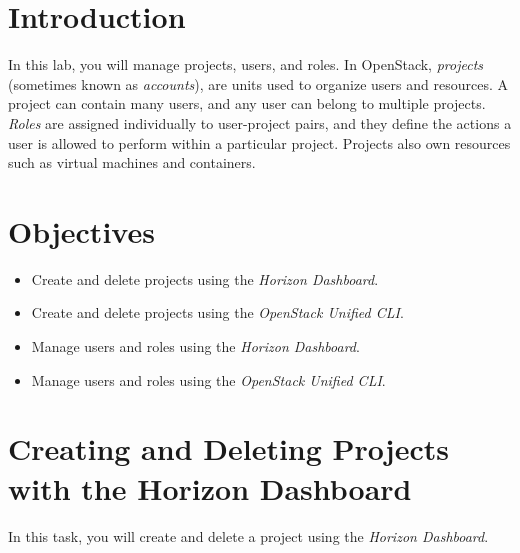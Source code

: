 \documentclass[letterpaper, 12pt]{article}
\begin{document}

\section*{Introduction}
\label{sec:introduction}
In this lab, you will manage projects, users, and roles.
In OpenStack, \textit{projects} (sometimes known as \textit{accounts}), are units used to organize users and resources.
A project can contain many users, and any user can belong to multiple projects.
\textit{Roles} are assigned individually to user-project pairs, and they define the actions a user is allowed to perform within a particular project.
Projects also own resources such as virtual machines and containers.

\section*{Objectives}
\label{sec:objectives}
\begin{itemize}[itemsep=0pt]
    \item Create and delete projects using the \textit{Horizon Dashboard}.
    \item Create and delete projects using the \textit{OpenStack Unified CLI}.
    \item Manage users and roles using the \textit{Horizon Dashboard}.
    \item Manage users and roles using the \textit{OpenStack Unified CLI}.
\end{itemize}
\clearpage

\labsettings

\section{Creating and Deleting Projects with the Horizon Dashboard}
\label{sec:create_and_delete_projects_using_the_horizon_dashboard}
In this task, you will create and delete a project using the \textit{Horizon Dashboard}.
\end{document}
